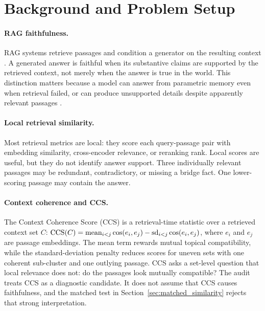 \section{Background and Problem Setup}
\label{sec:background}

\paragraph{RAG faithfulness.}
RAG systems retrieve passages and condition a generator on the resulting
context \citep{lewis2020rag,karpukhin2020dpr}. A generated answer is faithful
when its substantive claims are supported by the retrieved context, not merely
when the answer is true in the world. This distinction matters because a model
can answer from parametric memory even when retrieval failed, or can produce
unsupported details despite apparently relevant passages
\citep{maynez2020faithfulness,ji2023hallucination}.

\paragraph{Local retrieval similarity.}
Most retrieval metrics are local: they score each query-passage pair with
embedding similarity, cross-encoder relevance, or reranking rank. Local scores
are useful, but they do not identify answer support. Three individually
relevant passages may be redundant, contradictory, or missing a bridge fact.
One lower-scoring passage may contain the answer.

\paragraph{Context coherence and CCS.}
The Context Coherence Score (CCS) is a retrieval-time statistic over a
retrieved context set \(C\):
\(\mathrm{CCS}(C)=\operatorname{mean}_{i<j}\cos(e_i,e_j)-
\operatorname{sd}_{i<j}\cos(e_i,e_j)\), where \(e_i\) and \(e_j\) are passage
embeddings. The mean term rewards mutual topical compatibility, while the
standard-deviation penalty reduces scores for uneven sets with one coherent
sub-cluster and one outlying passage.
CCS asks a set-level question that local relevance does not: do the passages
look mutually compatible? The audit treats CCS as a diagnostic candidate. It
does not assume that CCS causes faithfulness, and the matched test in
Section~\ref{sec:matched_similarity} rejects that strong interpretation.

